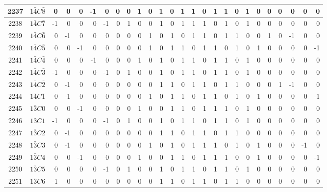 \documentclass[12 pt]{article}%
\begin{document}
\begin{tiny}
\begin{centering}
\begin{longtable}{|c|c||rrrrrrrrrrrrrrrrrrrrrrrr|}
      \hline
      2237 & $1\bar4C\bar8$ & 0 & 0 & 0 & -1 & 0 & 0 & 0 & 1 & 0 & 1 & 0 & 1 & 1 & 0 & 1 & 1 & 0 & 1 & 0 & 0 & 0 & 0 & 0 & 0 \\
      \hline
      2238 & $1\bar4C\bar7$ & -1 & 0 & 0 & 0 & -1 & 0 & 1 & 0 & 0 & 1 & 0 & 1 & 1 & 1 & 0 & 1 & 0 & 1 & 0 & 0 & 0 & 0 & 0 & 0 \\
      \hline
      2239 & $1\bar4C\bar6$ & 0 & -1 & 0 & 0 & 0 & 0 & 0 & 0 & 1 & 0 & 1 & 0 & 1 & 1 & 0 & 1 & 1 & 0 & 0 & 1 & 0 & -1 & 0 & 0 \\
      \hline
      2240 & $1\bar4C\bar5$ & 0 & 0 & -1 & 0 & 0 & 0 & 0 & 0 & 1 & 0 & 1 & 1 & 0 & 1 & 1 & 0 & 1 & 0 & 1 & 0 & 0 & 0 & 0 & -1 \\
      \hline
      2241 & $1\bar4C\bar4$ & 0 & 0 & 0 & -1 & 0 & 0 & 0 & 1 & 0 & 1 & 0 & 1 & 1 & 0 & 1 & 1 & 0 & 1 & 0 & 0 & 0 & 0 & 0 & 0 \\
      \hline
      2242 & $1\bar4C\bar3$ & -1 & 0 & 0 & 0 & -1 & 0 & 1 & 0 & 0 & 1 & 0 & 1 & 1 & 0 & 1 & 1 & 0 & 1 & 0 & 0 & 0 & 0 & 0 & 0 \\
      \hline
      2243 & $1\bar4C\bar2$ & 0 & -1 & 0 & 0 & 0 & 0 & 0 & 0 & 0 & 1 & 1 & 0 & 1 & 1 & 0 & 1 & 1 & 0 & 0 & 0 & 1 & -1 & 0 & 0 \\
      \hline
      2244 & $1\bar4C\bar1$ & 0 & -1 & 0 & 0 & 0 & 0 & 0 & 0 & 1 & 0 & 1 & 1 & 0 & 1 & 1 & 0 & 1 & 0 & 1 & 0 & 0 & 0 & 0 & -1 \\
      \hline
      2245 & $1\bar3C0$ & 0 & 0 & -1 & 0 & 0 & 0 & 0 & 1 & 0 & 0 & 1 & 1 & 0 & 1 & 1 & 1 & 0 & 1 & 0 & 0 & 0 & 0 & 0 & 0 \\
      \hline
      2246 & $1\bar3C1$ & -1 & 0 & 0 & 0 & -1 & 0 & 1 & 0 & 0 & 1 & 0 & 1 & 1 & 0 & 1 & 1 & 0 & 1 & 0 & 0 & 0 & 0 & 0 & 0 \\
      \hline
      2247 & $1\bar3C2$ & 0 & -1 & 0 & 0 & 0 & 0 & 0 & 0 & 0 & 1 & 1 & 0 & 1 & 1 & 0 & 1 & 1 & 0 & 0 & 0 & 0 & 0 & 0 & 0 \\
      \hline
      2248 & $1\bar3C3$ & 0 & -1 & 0 & 0 & 0 & 0 & 0 & 0 & 1 & 0 & 1 & 0 & 1 & 1 & 1 & 0 & 1 & 0 & 1 & 0 & 0 & 0 & -1 & 0 \\
      \hline
      2249 & $1\bar3C4$ & 0 & 0 & -1 & 0 & 0 & 0 & 0 & 1 & 0 & 0 & 1 & 1 & 0 & 1 & 1 & 1 & 0 & 0 & 1 & 0 & 0 & 0 & 0 & -1 \\
      \hline
      2250 & $1\bar3C5$ & 0 & 0 & 0 & 0 & -1 & 0 & 1 & 0 & 0 & 1 & 0 & 1 & 1 & 0 & 1 & 1 & 0 & 1 & 0 & 0 & 0 & 0 & 0 & 0 \\
      \hline
      2251 & $1\bar3C6$ & -1 & 0 & 0 & 0 & 0 & 0 & 0 & 0 & 0 & 1 & 1 & 0 & 1 & 1 & 0 & 1 & 1 & 0 & 0 & 0 & 0 & 0 & 0 & 0 \\

\end{longtable}
\end{centering}
\end{tiny}
\end{document}

